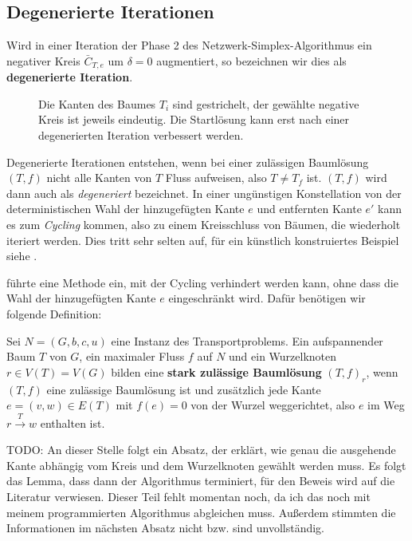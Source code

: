 \subsection{Degenerierte Iterationen}\label{ch:deg}

\begin{defn}Wird in einer Iteration der Phase 2 des Netzwerk-Simplex-Algorithmus ein negativer Kreis $\bar{C}_{T,e}$ um $\delta=0$ augmentiert, so bezeichnen wir dies als \textbf{degenerierte Iteration}.
\end{defn}

\begin{figure}[!ht]\centering
	
	\caption{Die Kanten des Baumes $T_i$ sind gestrichelt, der gewählte negative Kreis ist jeweils eindeutig. Die Startlösung kann erst nach einer degenerierten Iteration verbessert werden.}
	\label{fig:deg}
\end{figure}

Degenerierte Iterationen entstehen, wenn bei einer zulässigen Baumlösung $(T,f)$ nicht alle Kanten von $T$ Fluss aufweisen, also $T\neq T_f$ ist. $(T,f)$ wird dann auch als \emph{degeneriert} bezeichnet. In einer ungünstigen Konstellation von der deterministischen Wahl der hinzugefügten Kante $e$ und entfernten Kante $e'$ kann es zum \emph{Cycling} kommen, also zu einem Kreisschluss von Bäumen, die wiederholt iteriert werden. Dies tritt sehr selten auf, für ein künstlich konstruiertes Beispiel siehe \cite[S. 303]{NSAbook}.

\cite[Cunningham, 1976]{cycling} führte eine Methode ein, mit der Cycling verhindert werden kann, ohne dass die Wahl der hinzugefügten Kante $e$ eingeschränkt wird. Dafür benötigen wir folgende Definition:

\begin{defn}Sei $N=(G,b,c,u)$ eine Instanz des Transportproblems. Ein aufspannender Baum $T$ von $G$, ein maximaler Fluss $f$ auf $N$ und ein Wurzelknoten $r\in V(T)=V(G)$ bilden eine \textbf{stark zulässige Baumlösung} $(T,f)_r$, wenn $(T,f)$ eine zulässige Baumlösung ist und zusätzlich jede Kante $e=(v,w)\in E(T)$ mit $f(e)=0$ von der Wurzel weggerichtet, also $e$ im Weg $r\xrightarrow{T}w$ enthalten ist.\end{defn}

TODO: An dieser Stelle folgt ein Absatz, der erklärt, wie genau die ausgehende Kante abhängig vom Kreis und dem Wurzelknoten gewählt werden muss. Es folgt das Lemma, dass dann der Algorithmus terminiert, für den Beweis wird auf die Literatur verwiesen. Dieser Teil fehlt momentan noch, da ich das noch mit meinem programmierten Algorithmus abgleichen muss. Außerdem stimmten die Informationen im nächsten Absatz nicht bzw. sind unvollständig.

